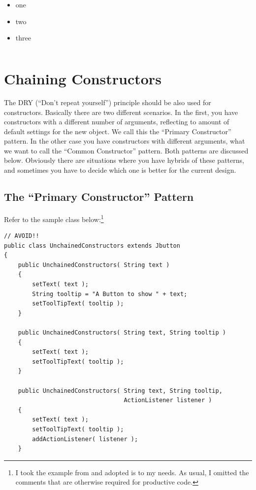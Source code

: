 \documentclass[11pt,a4paper, titlepage, parskip=half, headsepline, footsepline, cleardoublepage=current, headheight=1cm]{scrbook}
\begin{document}
\begin{itemize}[nosep]
\item{one}
\item{two}
\item{three}
\end{itemize}

\begin{lstlisting}[numbers=left]
\end{lstlisting}

\section{Chaining Constructors}\label{sec:ChainingConstructors}
The DRY (“Don’t repeat yourself”) principle should be also used for constructors. Basically there are two different scenarios. In the first, you have constructors with a different number of arguments, reflecting to amount of default settings for the new object. We call this the “Primary Constructor” pattern.
In the other case you have constructors with different arguments, what we want to call the “Common Constructor” pattern. Both patterns are discussed below.
Obviously there are situations where you have hybrids of these patterns, and sometimes you have to decide which one is better for the current design.
\subsection{The “Primary Constructor” Pattern}
Refer to the sample class below:\footnote{I took the example from \autocite{Simmons:HARDCORE_JAVA} and adopted is to my needs. As usual, I omitted the comments that are otherwise required for productive code.}
\begin{lstlisting}
// AVOID!!
public class UnchainedConstructors extends Jbutton
{
    public UnchainedConstructors( String text )
    {
        setText( text );
        String tooltip = "A Button to show " + text;
        setToolTipText( tooltip );
    }
    
    public UnchainedConstructors( String text, String tooltip )
    {
        setText( text );
        setToolTipText( tooltip );
    }
    
    public UnchainedConstructors( String text, String tooltip,
                                  ActionListener listener )
    {
        setText( text );
        setToolTipText( tooltip );
        addActionListener( listener );
    }
\end{lstlisting}
\end{document}

